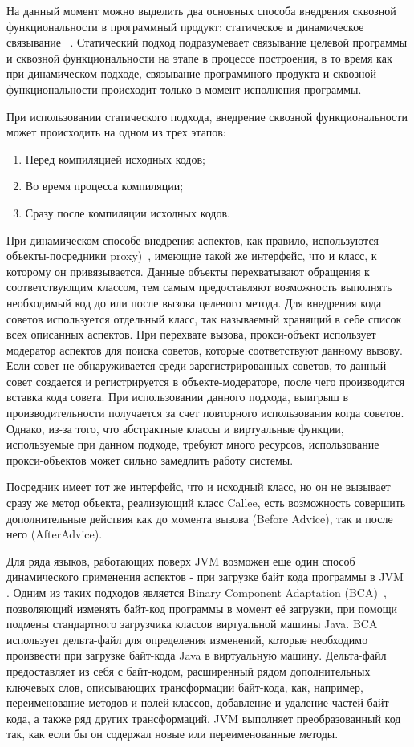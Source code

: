 На данный момент можно выделить два основных способа внедрения сквозной
функциональности в программный продукт: статическое и динамическое связывание~
\cite{static_and_dynamic_AOP}.
Статический подход подразумевает связывание целевой программы и сквозной
функциональности на этапе в процессе построения, в то время как при динамическом
подходе, связывание программного продукта и сквозной функциональности происходит
только в момент исполнения программы.

При использовании статического подхода, внедрение сквозной функциональности
может происходить на одном из трех этапов:
\begin{enumerate}
  \item Перед компиляцией исходных кодов;
  \item Во время процесса компиляции;
  \item Сразу после компиляции исходных кодов.
\end{enumerate}

При динамическом способе внедрения аспектов, как правило, используются
объекты-посредники proxy)~\cite{aspect_dynamic_weavers}, имеющие такой же
интерфейс, что и класс, к которому он привязывается.
Данные объекты перехватывают обращения к соответствующим классом, тем самым
предоставляют возможность выполнять необходимый код до или после вызова целевого
метода.
Для внедрения кода советов используется отдельный класс, так называемый
 хранящий в себе список всех описанных аспектов.
При перехвате вызова, прокси-объект использует модератор аспектов для поиска
советов, которые соответствуют данному вызову.
Если совет не обнаруживается среди зарегистрированных советов, то данный совет
создается и регистрируется в объекте-модераторе, после чего производится вставка
кода совета.
При использовании данного подхода, выигрыш в производительности получается за
счет повторного использования когда советов.
Однако, из-за того, что абстрактные классы и виртуальные функции, используемые
при данном подходе, требуют много ресурсов, использование прокси-объектов может
сильно замедлить работу системы.

Посредник имеет тот же интерфейс, что и исходный класс, но он не вызывает 
сразу же метод объекта, реализующий класс Callee, есть возможность 
совершить дополнительные действия как до момента вызова (Before Advice), 
так и после него (AfterAdvice).

Для ряда языков, работающих поверх JVM возможен еще один способ динамического
применения аспектов - при загрузке байт кода программы в JVM~
\cite{aspect_dynamic_weavers_in_oop}.
Одним из таких подходов является Binary Component Adaptation (BCA)~\cite{bca},
позволяющий изменять байт-код программы в момент её загрузки, при помощи
подмены стандартного загрузчика классов виртуальной машины Java.
BCA использует дельта-файл для определения изменений, которые необходимо
произвести при загрузке байт-кода Java в виртуальную машину.
Дельта-файл предоставляет из себя с байт-кодом, расширенный рядом дополнительных
ключевых слов, описывающих трансформации байт-кода, как, например,
переименование методов и полей классов, добавление и удаление частей байт-кода,
а также ряд других трансформаций.
JVM выполняет преобразованный код так, как если бы он содержал новые или
переименованные методы.

